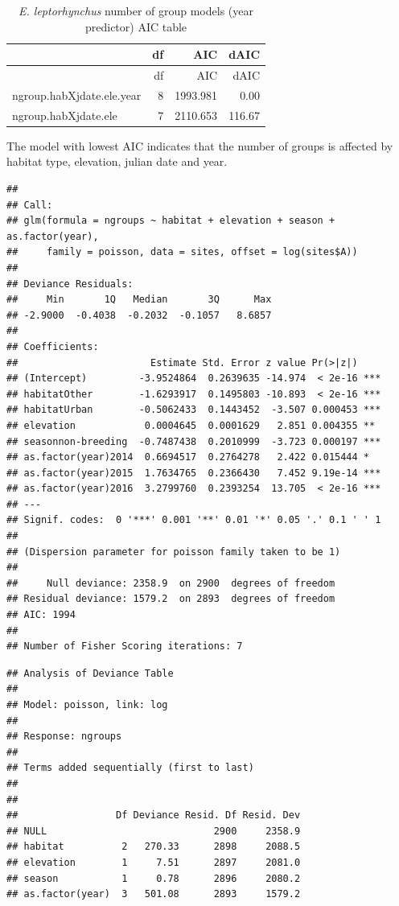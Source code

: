 \documentclass[]{article}
\begin{document}
\begin{longtable}[]{@{}lrrr@{}}
\caption{\textit{E. leptorhynchus} number of group models (year
predictor) AIC table}\tabularnewline
\toprule
& df & AIC & dAIC\tabularnewline
\midrule
\endfirsthead
\toprule
& df & AIC & dAIC\tabularnewline
\midrule
\endhead
ngroup.habXjdate.ele.year & 8 & 1993.981 & 0.00\tabularnewline
ngroup.habXjdate.ele & 7 & 2110.653 & 116.67\tabularnewline
\bottomrule
\end{longtable}

The model with lowest AIC indicates that the number of groups is
affected by habitat type, elevation, julian date and year.

\begin{verbatim}
## 
## Call:
## glm(formula = ngroups ~ habitat + elevation + season + as.factor(year), 
##     family = poisson, data = sites, offset = log(sites$A))
## 
## Deviance Residuals: 
##     Min       1Q   Median       3Q      Max  
## -2.9000  -0.4038  -0.2032  -0.1057   8.6857  
## 
## Coefficients:
##                       Estimate Std. Error z value Pr(>|z|)    
## (Intercept)         -3.9524864  0.2639635 -14.974  < 2e-16 ***
## habitatOther        -1.6293917  0.1495803 -10.893  < 2e-16 ***
## habitatUrban        -0.5062433  0.1443452  -3.507 0.000453 ***
## elevation            0.0004645  0.0001629   2.851 0.004355 ** 
## seasonnon-breeding  -0.7487438  0.2010999  -3.723 0.000197 ***
## as.factor(year)2014  0.6694517  0.2764278   2.422 0.015444 *  
## as.factor(year)2015  1.7634765  0.2366430   7.452 9.19e-14 ***
## as.factor(year)2016  3.2799760  0.2393254  13.705  < 2e-16 ***
## ---
## Signif. codes:  0 '***' 0.001 '**' 0.01 '*' 0.05 '.' 0.1 ' ' 1
## 
## (Dispersion parameter for poisson family taken to be 1)
## 
##     Null deviance: 2358.9  on 2900  degrees of freedom
## Residual deviance: 1579.2  on 2893  degrees of freedom
## AIC: 1994
## 
## Number of Fisher Scoring iterations: 7
\end{verbatim}

\begin{verbatim}
## Analysis of Deviance Table
## 
## Model: poisson, link: log
## 
## Response: ngroups
## 
## Terms added sequentially (first to last)
## 
## 
##                 Df Deviance Resid. Df Resid. Dev
## NULL                             2900     2358.9
## habitat          2   270.33      2898     2088.5
## elevation        1     7.51      2897     2081.0
## season           1     0.78      2896     2080.2
## as.factor(year)  3   501.08      2893     1579.2
\end{verbatim}
\end{document}
